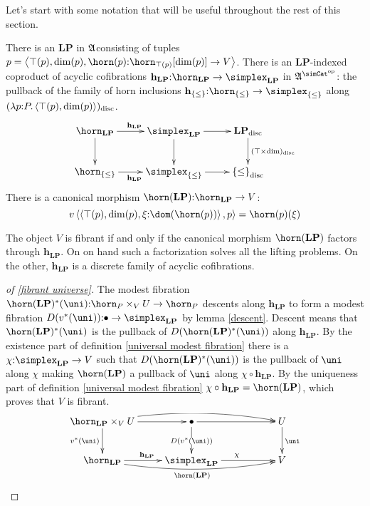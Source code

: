 \documentclass[csh.tex]{subfiles}
\begin{document}
Let's start with some notation that will be useful throughout the rest of this section.
\newcommand\LP{\mathbf{LP}}
\newcommand\foh{\mathbf{h}}
\begin{definition}
There is an  $\LP$ in $\mathfrak A$consisting of tuples $p = \tuplet{\top(p),\dim(p),\horn(p)\of\horn_{\top(p)}[\dim(p)]\to V}$. 
There is an $\LP$-indexed coproduct of acyclic cofibrations $\foh_\LP\of\horn_\LP \to \simplex_\LP$ in $\ambient\s$: the pullback of the family of horn inclusions $\foh_{\set\leq}\of\horn_{\set\leq} \to \simplex_{\set\leq}$ along $(\lambda p\mathord : P .\left\langle \top(p),\dim(p) \right\rangle)_{\rm disc}$.
\[\xymatrix{
\horn_\LP \ar[r]^{\foh_\LP}\ar[d] & \simplex_\LP\ar[d]\ar[r] & \LP\disc\ar[d]^{(\top\times\dim)\disc} \\
\horn_{\set\leq} \ar[r]_{\foh_\LP} & \simplex_{\set\leq}\ar[r] &\set\leq\disc
}\]
There is a canonical morphism $\horn(\LP)\of \horn_\LP\to V$:
\[ v\tuplet{\tuplet{\top(p),\dim(p),\xi\of \dom(\horn(p))},p} = \horn(p)(\xi)\]
\end{definition}

\begin{remark} The object $V$ is fibrant if and only if the canonical morphism $\horn(\LP)$ factors through $\foh_\LP$. On on hand such a factorization solves all the lifting problems. On the other, $\foh_\LP$ is a discrete family of acyclic cofibrations.
\end{remark}

\begin{proof}[of \ref{fibrant universe}]
The modest fibration $\horn(\LP)\ri(\uni)\of \horn_P\times_V U \to \horn_P$ descents along $\foh_\LP$ to form a modest fibration $D(v\ri(\uni))\of \bullet\to\simplex_\LP$ by lemma \ref{descent}. 
Descent means that $\horn(\LP)\ri(\uni)$ is the pullback of $D(\horn(\LP)\ri(\uni))$ along $\foh_\LP$.
By the existence part of definition \ref{universal modest fibration} there is a $\chi\of\simplex_\LP\to V$ such that $D(\horn(\LP)\ri(\uni))$ is the pullback of $\uni$ along $\chi$ making $\horn(\LP)$ a pullback of $\uni$ along $\chi\circ \foh_\LP$. By the uniqueness part of definition \ref{universal modest fibration} $\chi\circ \foh_\LP=\horn(\LP)$, which proves that $V$ is fibrant.
\[\xymatrix{
\horn_\LP\times_V U \ar@/^2ex/[rrr] \ar[r]\ar[d]_{v\ri(\uni)} & \bullet \ar[rr]\ar[d]|{D(v\ri(\uni))} && U\ar[d]^\uni\\
\horn_\LP\ar@/_2ex/[rrr]_{\horn(\LP)}\ar[r]^{\foh_\LP} & \simplex_\LP\ar[rr]^{\chi} && V
}\]
\end{proof}
\end{document}
